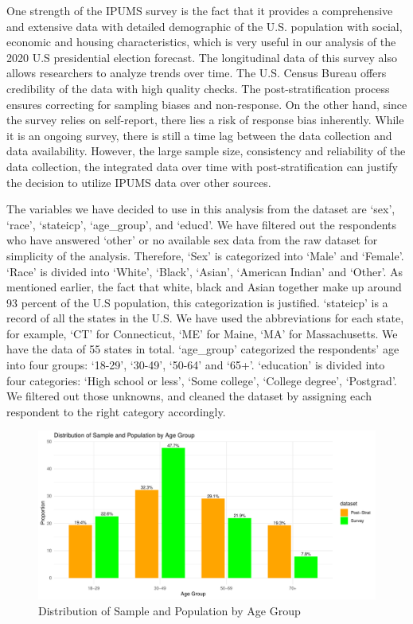 \documentclass[
  letterpaper,
  DIV=11,
  numbers=noendperiod]{scrartcl}
\begin{document}
One strength of the IPUMS survey is the fact that it provides a
comprehensive and extensive data with detailed demographic of the U.S.
population with social, economic and housing characteristics, which is
very useful in our analysis of the 2020 U.S presidential election
forecast. The longitudinal data of this survey also allows researchers
to analyze trends over time. The U.S. Census Bureau offers credibility
of the data with high quality checks. The post-stratification process
ensures correcting for sampling biases and non-response. On the other
hand, since the survey relies on self-report, there lies a risk of
response bias inherently. While it is an ongoing survey, there is still
a time lag between the data collection and data availability. However,
the large sample size, consistency and reliability of the data
collection, the integrated data over time with post-stratification can
justify the decision to utilize IPUMS data over other sources.

The variables we have decided to use in this analysis from the dataset
are `sex', `race', `stateicp', `age\_group', and `educd'. We have
filtered out the respondents who have answered `other' or no available
sex data from the raw dataset for simplicity of the analysis. Therefore,
`Sex' is categorized into `Male' and `Female'. `Race' is divided into
`White', `Black', `Asian', `American Indian' and `Other'. As mentioned
earlier, the fact that white, black and Asian together make up around 93
percent of the U.S population, this categorization is justified.
`stateicp' is a record of all the states in the U.S. We have used the
abbreviations for each state, for example, `CT' for Connecticut, `ME'
for Maine, `MA' for Massachusetts. We have the data of 55 states in
total. `age\_group' categorized the respondents' age into four groups:
`18-29', `30-49', `50-64' and `65+'. `education' is divided into four
categories: `High school or less', `Some college', `College degree',
`Postgrad'. We filtered out those unknowns, and cleaned the dataset by
assigning each respondent to the right category accordingly.

\begin{figure}

{\centering \includegraphics{paper_files/figure-pdf/fig-distribution-by-age-group-1.pdf}

}

\caption{\label{fig-distribution-by-age-group}Distribution of Sample and
Population by Age Group}

\end{figure}
\end{document}
